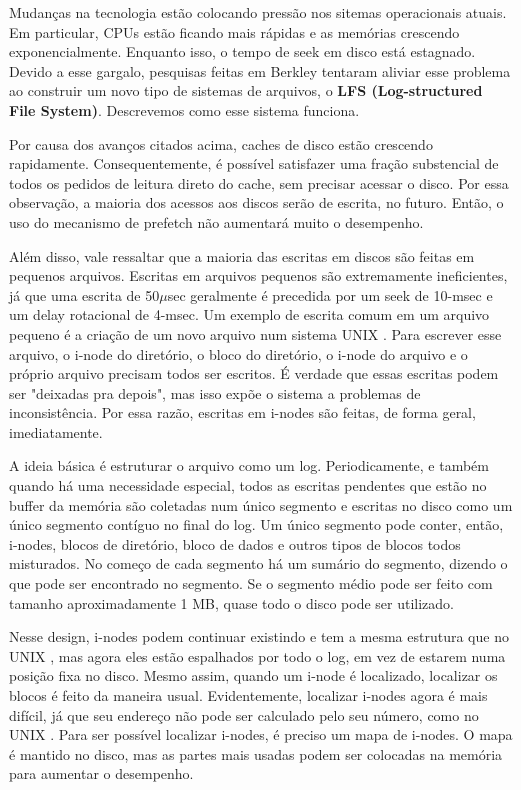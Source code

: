 \documentclass{article}
\newcommand\unix{{\color{red}UNIX} }
\begin{document}
Mudanças na tecnologia estão colocando pressão nos sitemas operacionais atuais. Em particular, CPUs estão ficando mais rápidas e as memórias crescendo exponencialmente. Enquanto isso, o tempo de seek em disco está estagnado. Devido a esse gargalo, pesquisas feitas em Berkley tentaram aliviar esse problema ao construir um novo tipo de sistemas de arquivos, o \textbf{LFS (Log-structured File System)}. Descrevemos como esse sistema funciona.

Por causa dos avanços citados acima, caches de disco estão crescendo rapidamente. Consequentemente, é possível satisfazer uma fração substencial de todos os pedidos de leitura direto do cache, sem precisar acessar o disco. Por essa observação, a maioria dos acessos aos discos serão de escrita, no futuro. Então, o uso do mecanismo de prefetch não aumentará muito o desempenho.

Além disso, vale ressaltar que a maioria das escritas em discos são feitas em pequenos arquivos. Escritas em arquivos pequenos são extremamente ineficientes, já que uma escrita de 50$\mu$sec geralmente é precedida por um seek de 10-msec e um delay rotacional de 4-msec. Um exemplo de escrita comum em um arquivo pequeno é a criação de um novo arquivo num sistema \unix. Para escrever esse arquivo, o i-node do diretório, o bloco do diretório, o i-node do arquivo e o próprio arquivo precisam todos ser escritos. É verdade que essas escritas podem ser "deixadas pra depois", mas isso expõe o sistema a problemas de inconsistência. Por essa razão, escritas em i-nodes são feitas, de forma geral, imediatamente.

A ideia básica é estruturar o arquivo como um log. Periodicamente, e também quando há uma necessidade especial, todos as escritas pendentes que estão no buffer da memória são coletadas num único segmento e escritas no disco como um único segmento contíguo no final do log. Um único segmento pode conter, então, i-nodes, blocos de diretório, bloco de dados e outros tipos de blocos todos misturados. No começo de cada segmento há um sumário do segmento, dizendo o que pode ser encontrado no segmento. Se o segmento médio pode ser feito com tamanho aproximadamente 1 MB, quase todo o disco pode ser utilizado.

Nesse design, i-nodes podem continuar existindo e tem a mesma estrutura que no \unix, mas agora eles estão espalhados por todo o log, em vez de estarem numa posição fixa no disco. Mesmo assim, quando um i-node é localizado, localizar os blocos é feito da maneira usual. Evidentemente, localizar i-nodes agora é mais difícil, já que seu endereço não pode ser calculado pelo seu número, como no \unix. Para ser possível localizar i-nodes, é preciso um mapa de i-nodes. O mapa é mantido no disco, mas as partes mais usadas podem ser colocadas na memória para aumentar o desempenho.
\end{document}

